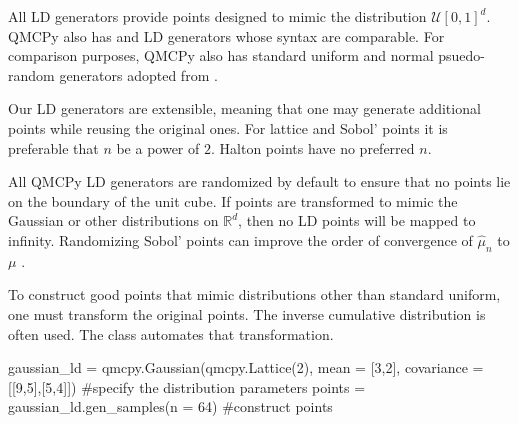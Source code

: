 \documentclass[11pt]{NSFamsart}
\newcommand{\reals}{{\mathbb{R}}}
\newcommand{\calu}{{\mathcal{U}}}
\newcommand{\hmu}{\hat{\mu}}
\begin{document}
All LD generators provide points designed to mimic the distribution $\calu[0,1]^d$.  QMCPy also has  \cite{DicPil10a} and  \cite{Hal60} LD generators whose syntax are comparable.  
For comparison purposes, QMCPy also has standard uniform and normal psuedo-random generators adopted from .  
 
Our LD generators are extensible, meaning that one may generate additional points while reusing the original ones.  For lattice and Sobol' points it is preferable that $n$ be a power of $2$.  Halton points have no preferred $n$.
 

All QMCPy LD generators are randomized by default to ensure that no points lie on the boundary of the unit cube.  If points are transformed to mimic the Gaussian or other distributions on $\reals^d$, then no LD points will be mapped to infinity.  Randomizing Sobol' points can improve the order of convergence of $\hmu_n$ to $\mu$ \cite{Owe97}.

To construct good points that mimic distributions other than standard uniform, one must transform the original points.  The  inverse cumulative distribution is often used.  The  class automates that transformation.
\begin{pythoncode}
gaussian_ld = qmcpy.Gaussian(qmcpy.Lattice(2), mean = [3,2], covariance = [[9,5],[5,4]])  #specify the distribution parameters 
points = gaussian_ld.gen_samples(n = 64)  #construct points
\end{pythoncode}
\end{document}
